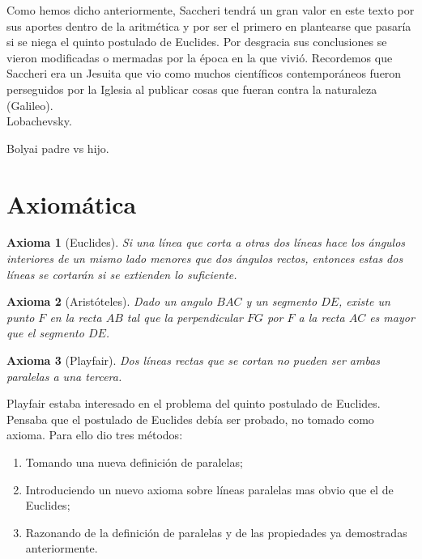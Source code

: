 \documentclass[a4paper]{amsart}
\theoremstyle{plain}
\newtheorem{axiom}{Axioma}
\begin{document}
Como hemos dicho anteriormente, Saccheri tendrá un gran valor en este texto por sus aportes dentro de la aritmética y por ser el primero en plantearse que pasaría si se niega el quinto postulado de Euclides. Por desgracia sus conclusiones se vieron modificadas o mermadas por la época en la que vivió. Recordemos que Saccheri era un Jesuita que vio como muchos científicos contemporáneos fueron perseguidos por la Iglesia al publicar cosas que fueran contra la naturaleza (Galileo).\\

Lobachevsky.

Bolyai padre vs hijo.


\section{Axiomática}

\begin{axiom}[Euclides]\label{Euclides}
Si una línea que corta a otras dos líneas hace los ángulos interiores de un mismo lado menores que dos ángulos rectos, entonces estas dos líneas se cortarán si se extienden lo suficiente. 
\end{axiom}

\begin{axiom}[Aristóteles]\label{Aristoteles}
Dado un angulo $BAC$ y un segmento $DE$, existe un punto $F$ en la recta $AB$ tal que la perpendicular $FG$ por $F$ a la recta $AC$ es mayor que el segmento $DE$.
\end{axiom}

\begin{axiom}[Playfair]\label{Playfair}
Dos líneas rectas que se cortan no pueden ser ambas paralelas a una tercera. 
\end{axiom}

Playfair estaba interesado en el problema del quinto postulado de Euclides. Pensaba que el postulado de Euclides debía ser probado, no tomado como axioma. Para ello dio tres métodos:
\begin{enumerate}
\item [(1)] Tomando una nueva definición de paralelas;
\item [(2)] Introduciendo un nuevo axioma sobre líneas paralelas mas obvio que el de Euclides;
\item [(3)] Razonando de la definición de paralelas y de las propiedades ya demostradas anteriormente.
\end{enumerate}
\end{document}
